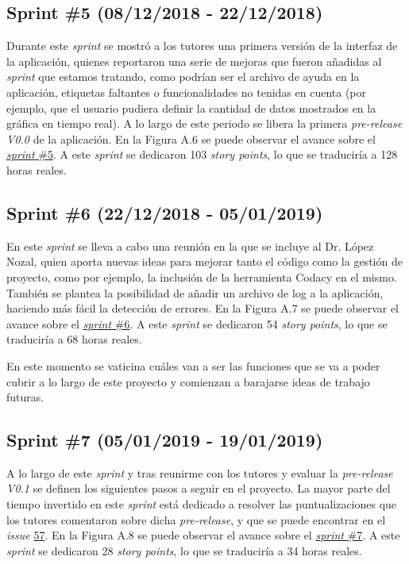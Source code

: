 \subsection{Sprint \#5 (08/12/2018 - 22/12/2018)}

Durante este \textit{sprint} se mostró a los tutores una primera versión de la interfaz de la aplicación, quienes reportaron una serie de mejoras que fueron añadidas al \textit{sprint} que estamos tratando, como podrían ser el archivo de ayuda en la aplicación, etiquetas faltantes o funcionalidades no tenidas en cuenta (por ejemplo, que el usuario pudiera definir la cantidad de datos mostrados en la gráfica en tiempo real). A lo largo de este periodo se libera la primera \textit{pre-release V0.0} de la aplicación. En la Figura A.6 se puede observar el avance sobre el \href{https://github.com/FranBurgos/TFG/milestone/6?closed=1}{\textit{sprint} \#5}. A este \textit{sprint} se dedicaron 103 \textit{story points}, lo que se traduciría a 128 horas reales.


\subsection{Sprint \#6 (22/12/2018 - 05/01/2019)}

En este \textit{sprint} se lleva a cabo una reunión en la que se incluye al Dr. López Nozal, quien aporta nuevas ideas para mejorar tanto el código como la gestión de proyecto, como por ejemplo, la inclusión de la herramienta Codacy en el mismo. También se plantea la posibilidad de añadir un archivo de log a la aplicación, haciendo más fácil la detección de errores. En la Figura A.7 se puede observar el avance sobre el \href{https://github.com/FranBurgos/TFG/milestone/7?closed=1}{\textit{sprint} \#6}. A este \textit{sprint} se dedicaron 54 \textit{story points}, lo que se traduciría a 68 horas reales.


En este momento se vaticina cuáles van a ser las funciones que se va a poder cubrir a lo largo de este proyecto y comienzan a barajarse ideas de trabajo futuras. 

\subsection{Sprint \#7 (05/01/2019 - 19/01/2019)}

A lo largo de este \textit{sprint} y tras reunirme con los tutores y evaluar la \textit{pre-release V0.1} se definen los siguientes pasos a seguir en el proyecto. La mayor parte del tiempo invertido en este \textit{sprint} está dedicado a resolver las puntualizaciones que los tutores comentaron sobre dicha \textit{pre-release}, y que se puede encontrar en el \textit{issue} \href{https://github.com/franburgos/tfg/issues/57}{57}. En la Figura A.8 se puede observar el avance sobre el \href{https://github.com/FranBurgos/TFG/milestone/8?closed=1}{\textit{sprint} \#7}. A este \textit{sprint} se dedicaron 28 \textit{story points}, lo que se traduciría a 34 horas reales.

